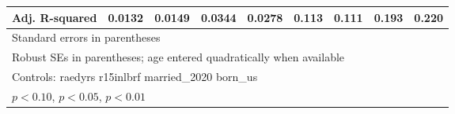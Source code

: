 \begin{table}[htbp]
\begin{tabular}{l*{8}{c}}
Adj. R-squared  &   0.0132         &   0.0149         &   0.0344         &   0.0278         &    0.113         &    0.111         &    0.193         &    0.220         \\
\bottomrule
\multicolumn{9}{l}{\footnotesize Standard errors in parentheses}\\
\multicolumn{9}{l}{\footnotesize Robust SEs in parentheses; age entered quadratically when available}\\
\multicolumn{9}{l}{\footnotesize Controls:  raedyrs r15inlbrf married\_2020 born\_us}\\
\multicolumn{9}{l}{\footnotesize \sym{*} \(p<0.10\), \sym{**} \(p<0.05\), \sym{***} \(p<0.01\)}\\
\end{tabular}
\end{table}
